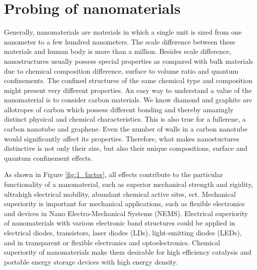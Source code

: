 \section{Probing of nanomaterials}
Generally, nanomaterials are materials in which a single unit is sized from one nanometer to a few hundred nanometers. The scale difference between these materials and human body is more than a million. Besides scale difference, nanostructures usually possess special properties as compared with bulk materials due to chemical composition difference, surface to volume ratio and quantum confinements. The confined structures of the same chemical type and composition might present very different properties. An easy way to understand a value of the nanomaterial is to consider carbon materials. We know diamond and graphite are allotropes of carbon which possess different bonding and thereby amazingly distinct physical and chemical characteristics. This is also true for a fullerene, a carbon nanotube and graphene. Even the number of walls in a carbon nanotube would significantly affect its properties. \cite{rodunerwhynano2006} Therefore, what makes nanostuctures distinctive is not only their size, but also their unique compositions, surface and quantum confinement effects. 

\renewcommand{\thefootnote}{\fnsymbol{footnote}}

As shown in Figure \ref{fig:1_factor}, all effects contribute to the particular functionality of a nanomaterial, such as superior mechanical strength and rigidity, ultrahigh electrical mobility, abundant chemical active sites, ect. Mechanical superiority is important for mechanical applications, such as flexible electronics and devices in Nano Electro-Mechanical Systems (NEMS). Electrical superiority of nanomaterials with various electronic band structures could be applied in electrical diodes, transistors, laser diodes (LDs), light-emitting diodes (LEDs), and in transparent or flexible electronics and optoelectronics. Chemical superiority of nanomaterials make them desirable for high efficiency catalysis and portable energy storage devices with high energy density. 


